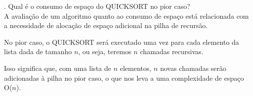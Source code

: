 . Qual é o consumo de espaço do QUICKSORT no pior caso?\\[6pt]
A avaliação de um algoritmo quanto ao consumo de espaço está relacionada com a necessidade de alocação de espaço adicional na pilha de recursão.

No pior caso, o QUICKSORT será executado uma vez para cada elemento da lista dada de tamanho $n$, ou seja, teremos $n$ chamadas recursivas.

Isso significa que, com uma lista de $n$ elementos, $n$ novas chamadas serão adicionadas à pilha no pior caso, o que nos leva a uma complexidade de espaço O($n$).\\